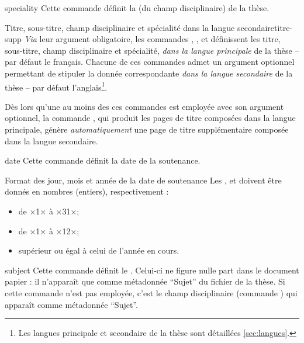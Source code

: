 %
\begin{docCommand}{speciality}{}
  Cette commande définit la  (du champ
  disciplinaire) de la thèse.
\end{docCommand}
%
\begin{dbremark}{Titre, sous-titre, champ disciplinaire et spécialité dans la
    langue secondaire}{titre-supp}
  \emph{Via} leur argument obligatoire, les commandes ,
  ,  et  définissent
  les titre, sous-titre, champ disciplinaire et spécialité, \emph{dans la
    langue principale} de la thèse -- par défaut le français. Chacune de ces
  commandes admet un argument optionnel permettant de stipuler la donnée
  correspondante \emph{dans la langue secondaire} de la thèse -- par défaut
  l'anglais\footnote{Les langues principale et secondaire de la thèse sont
    détaillées \vref{sec:langues}.}.

  Dès lors qu'une au moins des ces commandes est employée avec son argument
  optionnel, la commande , qui produit les pages de titre
  composées dans la langue principale, génère \emph{automatiquement} une page
  de titre supplémentaire composée dans la langue secondaire.
\end{dbremark}
%
\begin{docCommand}[doc description=\mandatory]{date}{}
  Cette commande définit la date de la soutenance.
  \begin{dbwarning}{Format des jour, mois et année de la date de
      soutenance}{}
    Les ,  et  doivent être donnés
    en nombres (entiers), respectivement :
    \begin{itemize}
    \item de ×1× à ×31×;
    \item de ×1× à ×12×;
    \item supérieur ou égal à celui de l'année en cours.
    \end{itemize}
  \end{dbwarning}
\end{docCommand}
%
\begin{docCommand}{subject}{}
  Cette commande définit le .  Celui-ci ne figure nulle
  part dans le document papier : il n'apparaît que comme métadonnée
  \enquote{Sujet} du fichier \pdf de la thèse. Si cette commande n'est pas
  employée, c'est le champ disciplinaire (commande ) qui
  apparaît comme métadonnée \enquote{Sujet}.
\end{docCommand}

